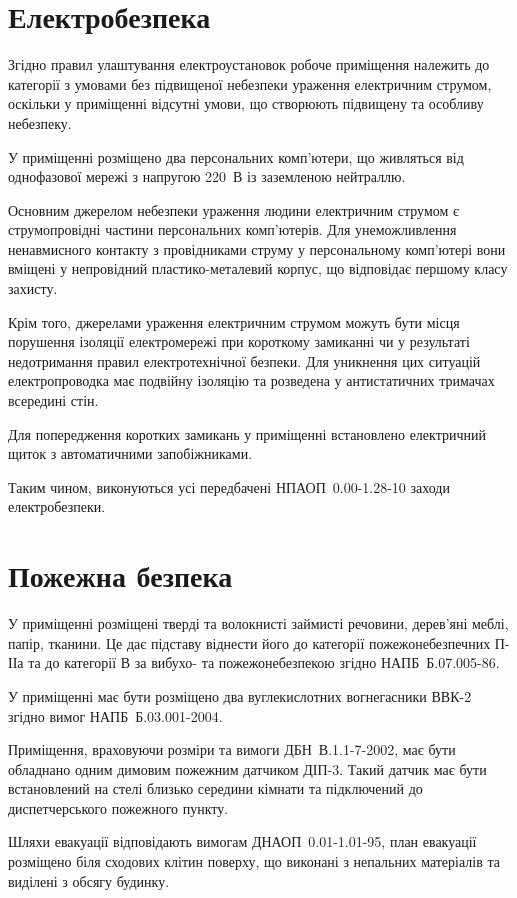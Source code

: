 \documentclass{diploma}
\begin{document}
\section{Електробезпека}
Згідно правил улаштування електроустановок робоче приміщення належить до категорії з умовами без підвищеної небезпеки ураження електричним струмом, оскільки у приміщенні відсутні умови, що створюють підвищену та особливу небезпеку.

У приміщенні розміщено два персональних комп’ютери, що живляться від однофазової мережі з напругою 220~В із заземленою нейтраллю.

Основним джерелом небезпеки ураження людини електричним струмом є струмопровідні частини персональних комп’ютерів. Для унеможливлення ненавмисного контакту з провідниками струму у персональному комп’ютері вони вміщені у непровідний пластико-металевий корпус, що відповідає першому класу захисту.

Крім того, джерелами ураження електричним струмом можуть бути місця порушення ізоляції електромережі при короткому замиканні чи у результаті недотримання правил електротехнічної безпеки. Для уникнення цих ситуацій електропроводка має подвійну ізоляцію та розведена у антистатичних тримачах всередині стін.

Для попередження коротких замикань у приміщенні встановлено електричний щиток з автоматичними запобіжниками.

Таким чином, виконуються усі передбачені НПАОП~0.00-1.28-10 заходи електробезпеки.

\section{Пожежна безпека}
У приміщенні розміщені тверді та волокнисті займисті речовини, дерев’яні меблі, папір, тканини. Це дає підставу віднести його до категорії пожежонебезпечних П-ІІа та до категорії В за вибухо- та пожежонебезпекою згідно НАПБ~Б.07.005-86.

У приміщенні має бути розміщено два вуглекислотних вогнегасники ВВК-2 згідно вимог НАПБ~Б.03.001-2004.

Приміщення, враховуючи розміри та вимоги ДБН~В.1.1-7-2002, має бути обладнано одним димовим пожежним датчиком ДІП-3. Такий датчик має бути встановлений на стелі близько середини кімнати та підключений до диспетчерського пожежного пункту.

Шляхи евакуації відповідають вимогам ДНАОП~0.01-1.01-95, план евакуації розміщено біля сходових клітин поверху, що виконані з непальних матеріалів та виділені з обсягу будинку.
\end{document}
